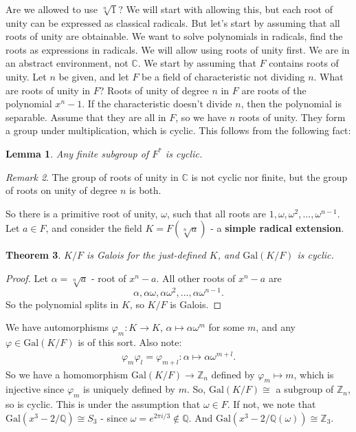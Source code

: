 \documentclass[9pt,reqno,twoside]{amsbook}
\theoremstyle{plain}
\newtheorem{theorem}{Theorem}[chapter]
\numberwithin{section}{chapter}
\numberwithin{equation}{chapter}
\newtheorem{lem}[theorem]{Lemma}
\theoremstyle{definition}
\theoremstyle{remark}
\newtheorem{rem}[theorem]{Remark}
\theoremstyle{plain}
\newcommand{\z}{\mathbb{Z}}
\newcommand{\Q}{\mathbb{Q}}
\renewcommand{\c}{\mathbb{C}}
\newcommand{\bee}{\begin{equation}\begin{aligned}}
\newcommand{\eee}{\end{aligned}\end{equation}}
\newcommand{\gal}{\mathrm{Gal}}
\newcommand{\wer}{\sqrt}
\renewcommand{\phi}{\varphi}
\begin{document}
Are we allowed to use $\wer[n]{1}$? We will start with allowing this, but each root of unity can be expressed as classical radicals. But let's start by assuming that all roots of unity are obtainable. We want to solve polynomials in radicals, find the roots as expressions in radicals. We will allow using roots of unity first. We are in an abstract environment, not $\c$. We start by assuming that $F$ contains roots of unity. Let $n$ be given, and let $F$ be a field of characteristic not dividing $n$. What are roots of unity in $F$? Roots of unity of degree $n$ in $F$ are roots of the polynomial $x^n - 1$. If the characteristic doesn't divide $n$, then the polynomial is separable. Assume that they are all in $F$, so we have $n$ roots of unity. They form a group under multiplication, which is cyclic. This follows from the following fact:
\begin{lem}
Any finite subgroup of $F^*$ is cyclic. 
\end{lem}

\begin{rem}
The group of roots of unity in $\c$ is not cyclic nor finite, but the group of roots on unity of degree $n$ is both. 
\end{rem}


So there is a primitive root of unity, $\omega$, such that all roots are $1,\omega,\omega^2,...,\omega^{n  -1}$. Let $a \in F$, and consider the field $K = F(\wer[n]{a})$ - a \textbf{simple radical extension}. 

\begin{theorem}
$K/F$ is Galois for the just-defined $K$, and $\gal(K/F)$ is cyclic. 
\end{theorem}

\begin{proof}
Let $\alpha = \wer[n]{a}$ - root of $x^n - a$. All other roots of $x^n - a$ are 
$$\alpha,\alpha\omega,\alpha\omega^2,...,\alpha\omega^{n - 1}.$$ So the polynomial splits in $K$, so $K/F$ is Galois. 
\end{proof}

We have automorphisms $\phi_m:K \to K$, $\alpha \mapsto \alpha\omega^m$ for some $m$, and any $\phi \in \gal(K/F)$ is of this sort. Also note:
\bee
\phi_m\phi_l = \phi_{m + l}:\alpha \mapsto \alpha\omega^{m + l}.
\eee
So we have a homomorphism $\gal(K/F) \to \z_n$ defined by $\phi_m \mapsto m$, which is injective since $\phi_m$ is uniquely defined by $m$. So, $\gal(K/F)  \cong$ a subgroup of $\z_n$, so is cyclic. This is under the assumption that $\omega \in F$. If not, we note that $\gal(x^3 - 2/\Q) \cong S_3$ - since $\omega = e^{2\pi i/3} \notin \Q$. And $\gal(x^3 - 2/\Q(\omega)) \cong \z_3$. 
\end{document}
